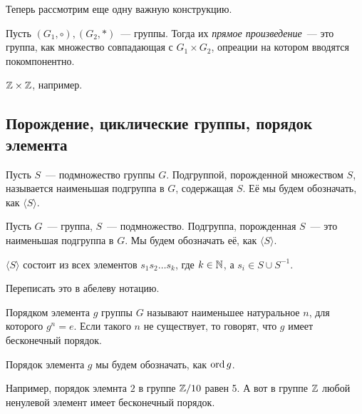 	Теперь рассмотрим еще одну важную конструкцию. 

	\begin{definition} 
		Пусть $(G_1, \circ), (G_2, *)$~--- группы. Тогда их \emph{прямое произведение}~--- это группа, как множество совпадающая с $G_1 \times G_2$, опреации на котором вводятся покомпонентно.   
	\end{definition}

	\begin{example}
		$\mathbb{Z} \times \mathbb{Z}$, например. 
	\end{example}
	

	\subsection{Порождение, циклические группы, порядок элемента}

	\begin{definition} 
		 Пусть $S$~--- подмножество группы $G$. Подгруппой, порожденной множеством $S$, называется наименьшая подгруппа в $G$, содержащая $S$.  Её мы будем обозначать, как $\langle S \rangle$.
	\end{definition}

	\begin{definition} 
		Пусть $G$~--- группа, $S$~--- подмножество. Подгруппа, порожденная $S$~--- это наименьшая подгруппа в $G$. Мы будем обозначать её, как $\langle S \rangle$. 
	\end{definition}

	\begin{statement} 
		$\langle S \rangle$ состоит из всех элементов $s_1 s_2 \ldots s_k$, где $k \in \mathbb{N}$, а $s _i \in S \cup S^{-1}$. 
	\end{statement}

	\begin{remark}
		Переписать это в абелеву нотацию. 
	\end{remark}

	\begin{definition} 
		Порядком элемента $g$ группы $G$ называют наименьшее натуральное $n$, для которого $g^n = e$. Если такого $n$ не существует, то говорят, что $g$ имеет бесконечный порядок. 

		Порядок элемента $g$ мы будем обозначать, как $\operatorname{ord}{g}$.
	\end{definition}

	\begin{example}
		Например, порядок элемнта $2$ в группе $\mathbb{Z}/10$ равен 5. А вот в группе $\mathbb{Z}$ любой ненулевой элемент имеет бесконечный порядок. 
	\end{example} 

